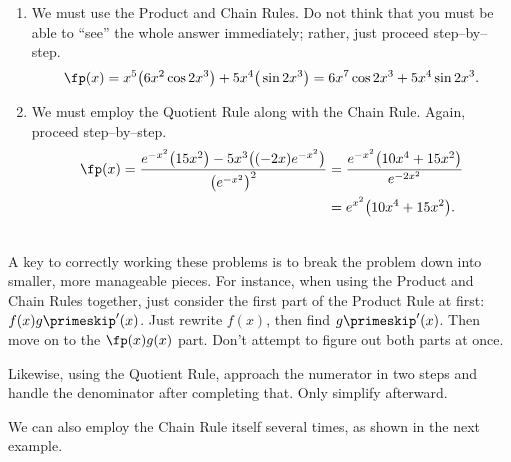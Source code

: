 {
\begin{enumerate}
\item		We must use the Product and Chain Rules. Do not think that you must be able to ``see'' the whole answer immediately; rather, just proceed step--by--step.
		$$\fp(x) = x^5\big(6x^2\cos 2x^3\big) + 5x^4\big(\sin 2x^3\big)= 6x^7\cos2x^3+5x^4\sin 2x^3.$$
\item		We must employ the Quotient Rule along with the Chain Rule. Again, proceed step--by--step.
\begin{align*}
\fp(x) = \frac{e^{-x^2}\big(15x^2\big) - 5x^3\big((-2x)e^{-x^2}\big)}{\big(e^{-x^2}\big)^2} &=\frac{e^{-x^2}\big(10x^4+15x^2\big)}{e^{-2x^2}}\\
 &= e^{x^2}\big(10x^4+15x^2\big).
\end{align*}
\end{enumerate}
\baselineskip
}\\

A key to correctly working these problems is to break the problem down into smaller, more manageable pieces. For instance, when using the Product and Chain Rules together, just consider the first part of the Product Rule at first: $f(x)g\primeskip'(x)$. Just rewrite $f(x)$, then find $g\primeskip'(x)$. Then move on to the $\fp(x)g(x)$ part. Don't attempt to figure out both parts at once.

Likewise, using the Quotient Rule, approach the numerator in two steps and handle the denominator after completing that. Only simplify afterward.

We can also employ the Chain Rule itself several times, as shown in the next example.\\

